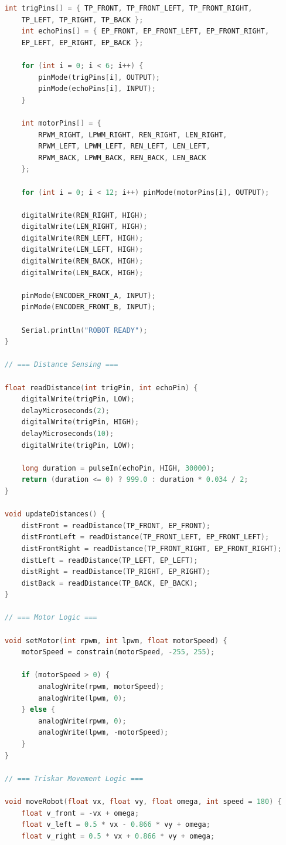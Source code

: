 \documentclass{article}
\begin{document}
\begin{lstlisting}[language=C, basicstyle=\ttfamily\footnotesize, frame=single, xleftmargin=10mm, xrightmargin=10mm]
    int trigPins[] = { TP_FRONT, TP_FRONT_LEFT, TP_FRONT_RIGHT, 
    TP_LEFT, TP_RIGHT, TP_BACK };
    int echoPins[] = { EP_FRONT, EP_FRONT_LEFT, EP_FRONT_RIGHT, 
    EP_LEFT, EP_RIGHT, EP_BACK };

    for (int i = 0; i < 6; i++) {
        pinMode(trigPins[i], OUTPUT);
        pinMode(echoPins[i], INPUT);
    }

    int motorPins[] = {
        RPWM_RIGHT, LPWM_RIGHT, REN_RIGHT, LEN_RIGHT,
        RPWM_LEFT, LPWM_LEFT, REN_LEFT, LEN_LEFT,
        RPWM_BACK, LPWM_BACK, REN_BACK, LEN_BACK
    };

    for (int i = 0; i < 12; i++) pinMode(motorPins[i], OUTPUT);

    digitalWrite(REN_RIGHT, HIGH);
    digitalWrite(LEN_RIGHT, HIGH);
    digitalWrite(REN_LEFT, HIGH);
    digitalWrite(LEN_LEFT, HIGH);
    digitalWrite(REN_BACK, HIGH);
    digitalWrite(LEN_BACK, HIGH);

    pinMode(ENCODER_FRONT_A, INPUT);
    pinMode(ENCODER_FRONT_B, INPUT);

    Serial.println("ROBOT READY");
}

// === Distance Sensing ===

float readDistance(int trigPin, int echoPin) {
    digitalWrite(trigPin, LOW);
    delayMicroseconds(2);
    digitalWrite(trigPin, HIGH);
    delayMicroseconds(10);
    digitalWrite(trigPin, LOW);

    long duration = pulseIn(echoPin, HIGH, 30000);
    return (duration <= 0) ? 999.0 : duration * 0.034 / 2;
}

void updateDistances() {
    distFront = readDistance(TP_FRONT, EP_FRONT);
    distFrontLeft = readDistance(TP_FRONT_LEFT, EP_FRONT_LEFT);
    distFrontRight = readDistance(TP_FRONT_RIGHT, EP_FRONT_RIGHT);
    distLeft = readDistance(TP_LEFT, EP_LEFT);
    distRight = readDistance(TP_RIGHT, EP_RIGHT);
    distBack = readDistance(TP_BACK, EP_BACK);
}

// === Motor Logic ===

void setMotor(int rpwm, int lpwm, float motorSpeed) {
    motorSpeed = constrain(motorSpeed, -255, 255);

    if (motorSpeed > 0) {
        analogWrite(rpwm, motorSpeed);
        analogWrite(lpwm, 0);
    } else {
        analogWrite(rpwm, 0);
        analogWrite(lpwm, -motorSpeed);
    }
}

// === Triskar Movement Logic ===

void moveRobot(float vx, float vy, float omega, int speed = 180) {
    float v_front = -vx + omega;
    float v_left = 0.5 * vx - 0.866 * vy + omega;
    float v_right = 0.5 * vx + 0.866 * vy + omega;


\end{lstlisting}
\end{document}
